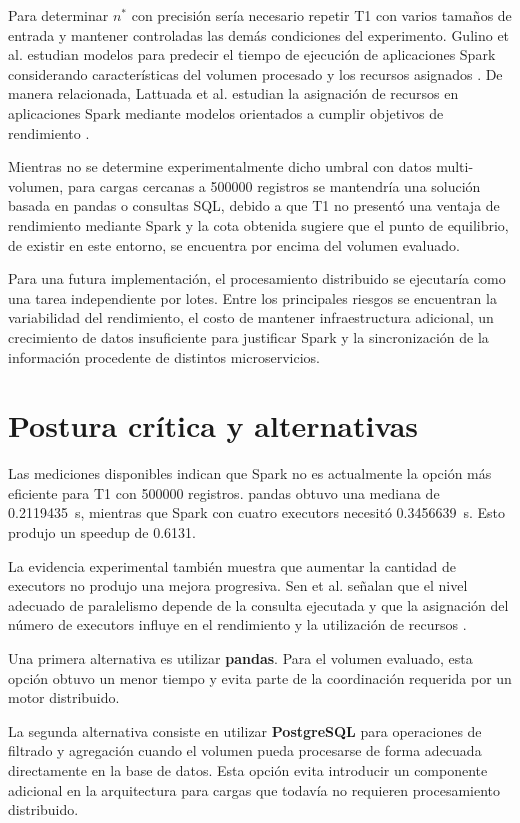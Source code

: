 \documentclass[12pt,a4paper]{article}
\begin{document}
Para determinar $n^{*}$ con precisión sería necesario repetir T1 con varios
tamaños de entrada y mantener controladas las demás condiciones del
experimento. Gulino et al. estudian modelos para predecir el tiempo de
ejecución de aplicaciones Spark considerando características del volumen
procesado y los recursos asignados \cite{gulino2020}. De manera relacionada,
Lattuada et al. estudian la asignación de recursos en aplicaciones Spark
mediante modelos orientados a cumplir objetivos de rendimiento
\cite{lattuada2020}.

Mientras no se determine experimentalmente dicho umbral con datos
multi-volumen, para cargas cercanas a \num{500000} registros se mantendría una
solución basada en pandas o consultas SQL, debido a que T1 no presentó una
ventaja de rendimiento mediante Spark y la cota obtenida sugiere que el punto
de equilibrio, de existir en este entorno, se encuentra por encima del volumen
evaluado.

Para una futura implementación, el procesamiento distribuido se ejecutaría
como una tarea independiente por lotes. Entre los principales riesgos se
encuentran la variabilidad del rendimiento, el costo de mantener
infraestructura adicional, un crecimiento de datos insuficiente para justificar
Spark y la sincronización de la información procedente de distintos
microservicios.

\section{Postura crítica y alternativas}

Las mediciones disponibles indican que Spark no es actualmente la opción más
eficiente para T1 con \num{500000} registros. pandas obtuvo una mediana de
\SI{0.2119435}{\second}, mientras que Spark con cuatro executors necesitó
\SI{0.3456639}{\second}. Esto produjo un speedup de \num{0.6131}.

La evidencia experimental también muestra que aumentar la cantidad de
executors no produjo una mejora progresiva. Sen et al. señalan que el nivel
adecuado de paralelismo depende de la consulta ejecutada y que la asignación
del número de executors influye en el rendimiento y la utilización de recursos
\cite{sen2021}.

Una primera alternativa es utilizar \textbf{pandas}. Para el volumen evaluado,
esta opción obtuvo un menor tiempo y evita parte de la coordinación requerida
por un motor distribuido.

La segunda alternativa consiste en utilizar \textbf{PostgreSQL} para
operaciones de filtrado y agregación cuando el volumen pueda procesarse de
forma adecuada directamente en la base de datos. Esta opción evita introducir
un componente adicional en la arquitectura para cargas que todavía no
requieren procesamiento distribuido.
\end{document}
